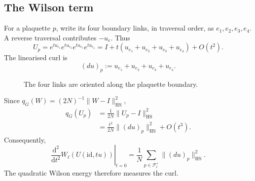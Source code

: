 \documentclass[10pt,reqno]{amsart}
\theoremstyle{definition}
\theoremstyle{remark}
\numberwithin{equation}{section}
\numberwithin{figure}{section}
\newcommand{\dd}{\mathrm d}
\newcommand{\id}{\mathrm{id}}
\begin{document}
\subsection{The Wilson term}
For a plaquette $p$, write its four boundary links, in traversal order,
as $e_1,e_2,e_3,e_4$. A reverse traversal contributes $-u_e$.
Thus
\begin{equation}\label{eq:identity-plaquette-product}
U_p=e^{tu_{e_1}}e^{tu_{e_2}}e^{tu_{e_3}}e^{tu_{e_4}}
=I+t(u_{e_1}+u_{e_2}+u_{e_3}+u_{e_4})+O(t^2).
\end{equation}
The linearised curl is
\begin{equation}\label{eq:linearised-curl}
(du)_p:=u_{e_1}+u_{e_2}+u_{e_3}+u_{e_4}.
\end{equation}
\begin{figure}[htbp]
\centering
{}
\caption{The four links are oriented along the plaquette boundary.}
\label{fig:linearised-plaquette}
\end{figure}
Since $q_G(W)=(2N)^{-1}\|W-I\|_{\mathrm{HS}}^2$,
\begin{equation}\label{eq:identity-plaquette-energy}
\begin{aligned}
q_G(U_p)&=\frac1{2N}\|U_p-I\|_{\mathrm{HS}}^2\\
&=\frac{t^2}{2N}\|(du)_p\|_{\mathrm{HS}}^2+O(t^3).
\end{aligned}
\end{equation}
Consequently,
\begin{equation}\label{eq:identity-wilson-hessian}
\left.\frac{\dd^2}{\dd t^2}W_\ell(U(\id,tu))\right|_{t=0}
=\frac1N\sum_{p\in\mathcal P_\ell^+}\|(du)_p\|_{\mathrm{HS}}^2.
\end{equation}
The quadratic Wilson energy therefore measures the curl.
\end{document}
